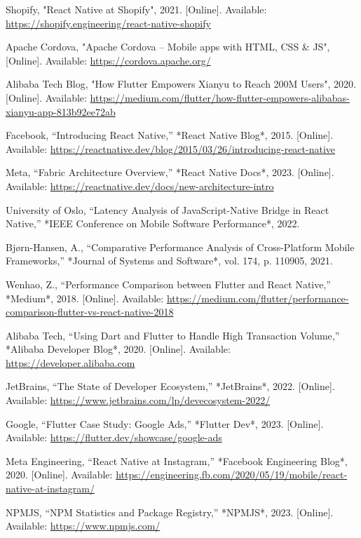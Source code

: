 \documentclass[12pt]{report}
\begin{document}
\begin{thebibliography}{1}
Shopify, "React Native at Shopify", 2021. [Online]. Available: \url{https://shopify.engineering/react-native-shopify}

Apache Cordova, "Apache Cordova – Mobile apps with HTML, CSS \& JS", [Online]. Available: \url{https://cordova.apache.org/}

Alibaba Tech Blog, "How Flutter Empowers Xianyu to Reach 200M Users", 2020. [Online]. Available: \url{https://medium.com/flutter/how-flutter-empowers-alibabas-xianyu-app-813b92ee72ab}
  
Facebook, “Introducing React Native,” *React Native Blog*, 2015. [Online]. Available: \url{https://reactnative.dev/blog/2015/03/26/introducing-react-native}

Meta, “Fabric Architecture Overview,” *React Native Docs*, 2023. [Online]. Available: \url{https://reactnative.dev/docs/new-architecture-intro}

University of Oslo, “Latency Analysis of JavaScript-Native Bridge in React Native,” *IEEE Conference on Mobile Software Performance*, 2022.

Bjørn-Hansen, A., “Comparative Performance Analysis of Cross-Platform Mobile Frameworks,” *Journal of Systems and Software*, vol. 174, p. 110905, 2021.

Wenhao, Z., “Performance Comparison between Flutter and React Native,” *Medium*, 2018. [Online]. Available: \url{https://medium.com/flutter/performance-comparison-flutter-vs-react-native-2018}

Alibaba Tech, “Using Dart and Flutter to Handle High Transaction Volume,” *Alibaba Developer Blog*, 2020. [Online]. Available: \url{https://developer.alibaba.com}

JetBrains, “The State of Developer Ecosystem,” *JetBrains*, 2022. [Online]. Available: \url{https://www.jetbrains.com/lp/devecosystem-2022/}

Google, “Flutter Case Study: Google Ads,” *Flutter Dev*, 2023. [Online]. Available: \url{https://flutter.dev/showcase/google-ads}

Meta Engineering, “React Native at Instagram,” *Facebook Engineering Blog*, 2020. [Online]. Available: \url{https://engineering.fb.com/2020/05/19/mobile/react-native-at-instagram/}

NPMJS, “NPM Statistics and Package Registry,” *NPMJS*, 2023. [Online]. Available: \url{https://www.npmjs.com/}


\end{thebibliography}
\end{document}
